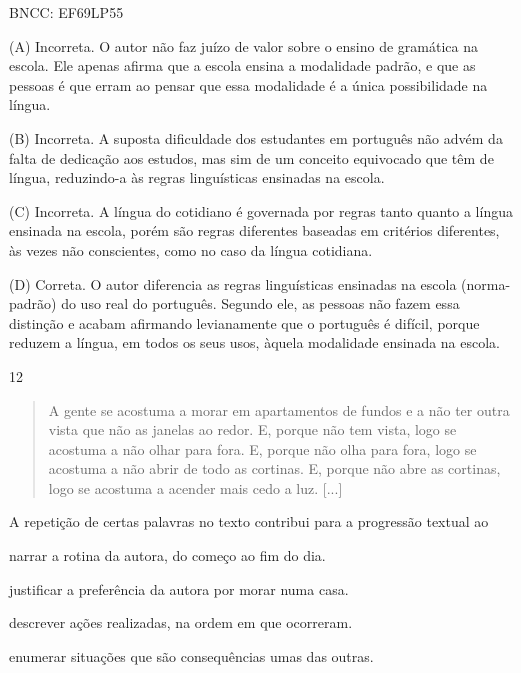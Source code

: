 BNCC: EF69LP55

(A) Incorreta. O autor não faz juízo de valor sobre o ensino de
gramática na escola. Ele apenas afirma que a escola ensina a modalidade
padrão, e que as pessoas é que erram ao pensar que essa modalidade é a
única possibilidade na língua.

(B) Incorreta. A suposta dificuldade dos estudantes em português não
advém da falta de dedicação aos estudos, mas sim de um conceito
equivocado que têm de língua, reduzindo-a às regras linguísticas
ensinadas na escola.

(C) Incorreta. A língua do cotidiano é governada por regras tanto quanto
a língua ensinada na escola, porém são regras diferentes baseadas em
critérios diferentes, às vezes não conscientes, como no caso da língua
cotidiana.

(D) Correta. O autor diferencia as regras linguísticas ensinadas na
escola (norma-padrão) do uso real do português. Segundo ele, as pessoas
não fazem essa distinção e acabam afirmando levianamente que o português
é difícil, porque reduzem a língua, em todos os seus usos, àquela
modalidade ensinada na escola.

\num{12}

\begin{quote}
A gente se acostuma a morar em apartamentos de fundos e a não ter outra
vista que não as janelas ao redor. E, porque não tem vista, logo se
acostuma a não olhar para fora. E, porque não olha para fora, logo se
acostuma a não abrir de todo as cortinas. E, porque não abre as
cortinas, logo se acostuma a acender mais cedo a luz. {[}...{]}
\end{quote}


A repetição de certas palavras no texto contribui para a progressão
textual ao

\begin{escolha}
\item narrar a rotina da autora, do começo ao fim do dia.

\item justificar a preferência da autora por morar numa casa.

\item descrever ações realizadas, na ordem em que ocorreram.

\item enumerar situações que são consequências umas das outras.
\end{escolha}

